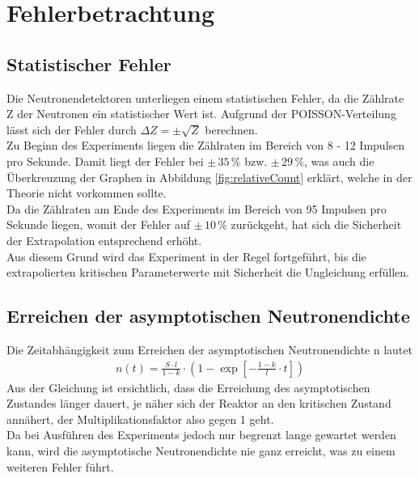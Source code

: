 \documentclass[12pt,german]{article}
\begin{document}
    \section{Fehlerbetrachtung}

    \subsection{Statistischer Fehler}
    Die Neutronendetektoren unterliegen einem statistischen Fehler, da die Zählrate Z der Neutronen ein statistischer Wert ist.
    Aufgrund der POISSON-Verteilung lässt sich der Fehler durch $\Delta Z = \pm\sqrt{Z}$ berechnen. \\
    Zu Beginn des Experiments liegen die Zählraten im Bereich von 8 - 12 Impulsen pro Sekunde. Damit liegt der Fehler bei $\pm\, 35\, \%$ bzw. $\pm\, 29\, \%$, was auch die Überkreuzung der Graphen in Abbildung \ref{fig:relativeCount} erklärt, welche in der Theorie nicht vorkommen sollte. \\
    Da die Zählraten am Ende des Experiments im Bereich von 95 Impulsen pro Sekunde liegen, womit der Fehler auf $\pm\, 10\, \%$ zurückgeht, hat sich die Sicherheit der Extrapolation entsprechend erhöht. \\
    Aus diesem Grund wird das Experiment in der Regel fortgeführt, bis die extrapolierten kritischen Parameterwerte mit Sicherheit die Ungleichung erfüllen.
    
    \subsection{Erreichen der asymptotischen Neutronendichte}
    Die Zeitabhängigkeit zum Erreichen der asymptotischen Neutronendichte n lautet
    \begin{align*}
        n(t) = \frac{S \cdot l}{1 - k} \cdot \left(1 - \exp \left[- \frac{1 - k}{l} \cdot t\right] \right)
    \end{align*}
    Aus der Gleichung ist ersichtlich, dass die Erreichung des asymptotischen Zustandes länger dauert, je näher sich der Reaktor an den kritischen Zustand annähert, der Multiplikationsfaktor also gegen 1 geht. \\
    Da bei Ausführen des Experiments jedoch nur begrenzt lange gewartet werden kann, wird die asymptotische Neutronendichte nie ganz erreicht, was zu einem weiteren Fehler führt.

    \newpage
\end{document}
